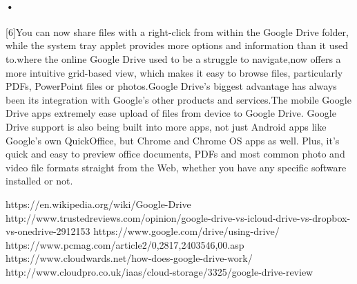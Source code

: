 \documentclass[11pt]{article}
\begin{document}
\paragraph {•}
[6]You can now share files with a right-click from within the Google Drive folder, while the system tray applet provides more options and information than it used to.where the online Google Drive used to be a struggle to navigate,now offers a more intuitive grid-based view, which makes it easy to browse files, particularly PDFs, PowerPoint files or photos.Google Drive’s biggest advantage has always been its integration with Google’s other products and services.The mobile Google Drive apps extremely ease upload of files from device to Google Drive. Google Drive support is also being built into more apps, not just Android apps like Google’s own QuickOffice, but Chrome and Chrome OS apps as well. Plus, it’s quick and easy to preview office documents, PDFs and most common photo and video file formats straight from the Web, whether you have any specific software installed or not.

\newpage

\begin{thebibliography}{9}
\bibitem{}
https://en.wikipedia.org/wiki/Google-Drive
\bibitem{}
http://www.trustedreviews.com/opinion/google-drive-vs-icloud-drive-vs-dropbox-vs-onedrive-2912153
 \bibitem{}
https://www.google.com/drive/using-drive/
 \bibitem{}
https://www.pcmag.com/article2/0,2817,2403546,00.asp
\bibitem{}
https://www.cloudwards.net/how-does-google-drive-work/
\bibitem{}
http://www.cloudpro.co.uk/iaas/cloud-storage/3325/google-drive-review

\end{thebibliography}
\end{document}
